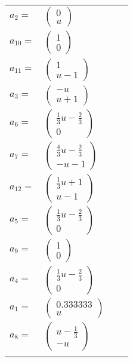 \documentclass[1p]{elsarticle_modified}
\theoremstyle{definition}
\begin{document}
\begin{tabular}{m{7pt} m{180pt} m{7pt} m{180pt} }
\flushright $a_{2}=$&$\begin{pmatrix}0\\u\end{pmatrix}$ \\
\flushright $a_{10}=$&$\begin{pmatrix}1\\0\end{pmatrix}$ \\
\flushright $a_{11}=$&$\begin{pmatrix}1\\u-1\end{pmatrix}$ \\
\flushright $a_{3}=$&$\begin{pmatrix}- u\\u+1\end{pmatrix}$ \\
\flushright $a_{6}=$&$\begin{pmatrix}\frac{1}{3} u-\frac{2}{3}\\0\end{pmatrix}$ \\
\flushright $a_{7}=$&$\begin{pmatrix}\frac{4}{3} u-\frac{2}{3}\\- u-1\end{pmatrix}$ \\
\flushright $a_{12}=$&$\begin{pmatrix}\frac{1}{3} u+1\\u-1\end{pmatrix}$ \\
\flushright $a_{5}=$&$\begin{pmatrix}\frac{1}{3} u-\frac{2}{3}\\0\end{pmatrix}$ \\
\flushright $a_{9}=$&$\begin{pmatrix}1\\0\end{pmatrix}$ \\
\flushright $a_{4}=$&$\begin{pmatrix}\frac{1}{3} u-\frac{2}{3}\\0\end{pmatrix}$ \\
\flushright $a_{1}=$&$\begin{pmatrix}0.333333\\u\end{pmatrix}$ \\
\flushright $a_{8}=$&$\begin{pmatrix}u-\frac{1}{3}\\- u\end{pmatrix}$\\&\end{tabular}
\end{document}
